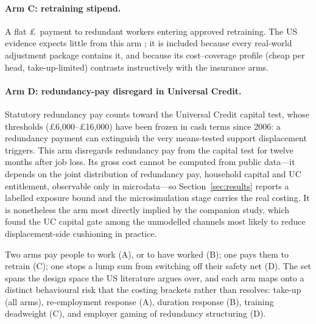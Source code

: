 \paragraph{Arm C: retraining stipend.} A flat
\pounds\TaaTrainPerWorker\ payment to redundant workers entering
approved retraining. The US evidence expects little from this arm
\citep{damicoschochet2012}; it is included because every real-world
adjustment package contains it, and because its cost--coverage profile
(cheap per head, take-up-limited) contrasts instructively with the
insurance arms.

\paragraph{Arm D: redundancy-pay disregard in Universal Credit.}
Statutory redundancy pay counts toward the Universal Credit capital test,
whose thresholds (\pounds 6{,}000--\pounds 16{,}000) have been frozen in
cash terms since 2006: a redundancy payment can extinguish the very
means-tested support displacement triggers. This arm disregards
redundancy pay from the capital test for twelve months after job loss.
Its gross cost cannot be computed from public data---it depends on the
joint distribution of redundancy pay, household capital and UC
entitlement, observable only in microdata---so Section~\ref{sec:results}
reports a labelled exposure bound and the microsimulation stage carries
the real costing. It is nonetheless the arm most directly implied by the
companion study, which found the UC capital gate among the unmodelled
channels most likely to reduce displacement-side cushioning in practice.

Two arms pay people to work (A), or to have worked (B); one pays them to
retrain (C); one stops a lump sum from switching off their safety net
(D). The set spans the design space the US literature argues over, and
each arm maps onto a distinct behavioural risk that the costing brackets
rather than resolves: take-up (all arms), re-employment response (A),
duration response (B), training deadweight (C), and employer gaming of
redundancy structuring (D).
